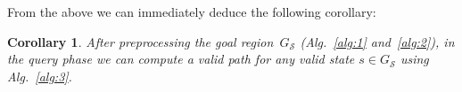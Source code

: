 \documentclass[letterpaper]{article} %
\newcommand{\calS}{\ensuremath{\mathcal{S}}\xspace}
\newcommand{\sAttract}{\ensuremath{s^{\text{attractor}}_i}\xspace}
\newcommand{\sGoal}{\ensuremath{s_{\text{goal}}\xspace}}
\newtheorem{theorem}{Theorem}
\newtheorem{lemma}{Lemma}
\newtheorem{cor}{Corollary}
\begin{document}
From the above we can immediately deduce the following corollary:

\vspace{2mm}

\begin{cor}
	After preprocessing the goal region~$G_\calS$ (Alg.~\ref{alg:1} and~\ref{alg:2}), in the query phase we can compute a valid path for any valid state $s \in G_\calS$ using Alg.~\ref{alg:3}.
\end{cor}
%
%
%
%
%
%
%
%
%
\end{document}
